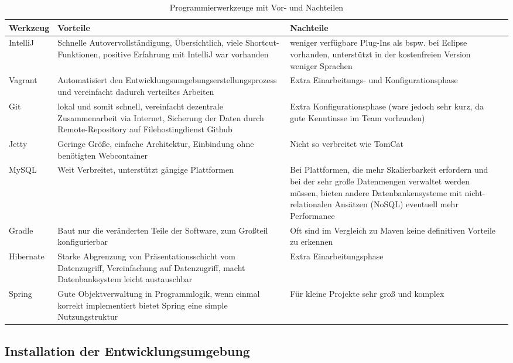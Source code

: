 \documentclass[12pt, oneside, a4paper]{article}		%
\begin{document}
\begin{table}[ht!]
\centering
\begin{tabular}{| p{1.9cm} | p{6.2cm} | p{6.2cm} | l}
\hline                       
\textbf{Werkzeug}	& \textbf{Vorteile}	& \textbf{Nachteile}	\\
\hline
IntelliJ	& Schnelle Autovervollständigung, Übersichtlich, viele Shortcut-Funktionen, positive Erfahrung mit IntelliJ war vorhanden	& weniger verfügbare Plug-Ins als bspw. bei Eclipse vorhanden, unterstützt in der kostenfreien Version weniger Sprachen	\\
\hline
Vagrant	& Automatisiert den Entwicklungsumgebungserstellungsprozess und vereinfacht dadurch verteiltes Arbeiten	& Extra Einarbeitungs- und Konfigurationsphase	\\
\hline
Git	& lokal und somit schnell, vereinfacht dezentrale Zusammenarbeit via Internet, Sicherung der Daten durch Remote-Repository auf Filehostingdienst Github	& Extra Konfigurationsphase	(ware jedoch sehr kurz, da gute Kenntinsse im Team vorhanden)	\\
\hline
Jetty	& Geringe Größe, einfache Architektur, Einbindung ohne benötigten Webcontainer & Nicht so verbreitet wie TomCat	\\
\hline
MySQL	& Weit Verbreitet, unterstützt gängige Plattformen	& Bei Plattformen, die mehr Skalierbarkeit erfordern und bei der sehr große Datenmengen verwaltet werden müssen, bieten andere Datenbankensysteme mit nicht-relationalen Ansätzen (NoSQL) eventuell mehr Performance \\
\hline
Gradle	& Baut nur die veränderten Teile der Software, zum Großteil konfigurierbar	& Oft sind im Vergleich zu Maven keine definitiven Vorteile zu erkennen	\\
\hline
Hibernate	& Starke Abgrenzung von Präsentationsschicht vom Datenzugriff, Vereinfachung auf Datenzugriff, macht Datenbanksystem leicht austauschbar	& Extra Einarbeitungsphase \\
\hline
Spring	& Gute Objektverwaltung in Programmlogik, wenn einmal korrekt implementiert bietet Spring eine simple Nutzungstruktur	& Für kleine Projekte sehr groß und komplex \\
\hline
\end{tabular}
\caption{Programmierwerkzeuge mit Vor- und Nachteilen}
\label{ProgrammierwerkzeugeMitVorUndNachteilen}
\end{table}

\newpage

\subsection{Installation der Entwicklungsumgebung}
\end{document}
